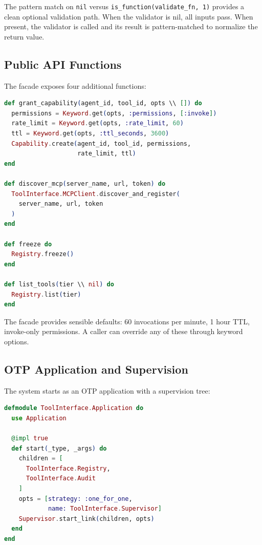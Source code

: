 \documentclass[12pt,a4paper]{article}
\theoremstyle{plain}
\theoremstyle{definition}
\begin{document}
The pattern match on \texttt{nil} versus \texttt{is\_function(validate\_fn, 1)} provides a clean optional validation path. When the validator is nil, all inputs pass. When present, the validator is called and its result is pattern-matched to normalize the return value.

\subsection{Public API Functions}

The facade exposes four additional functions:

\begin{lstlisting}[language=elixir, caption={Facade public API.}, label={lst:facade-api}]
def grant_capability(agent_id, tool_id, opts \\ []) do
  permissions = Keyword.get(opts, :permissions, [:invoke])
  rate_limit = Keyword.get(opts, :rate_limit, 60)
  ttl = Keyword.get(opts, :ttl_seconds, 3600)
  Capability.create(agent_id, tool_id, permissions,
                    rate_limit, ttl)
end

def discover_mcp(server_name, url, token) do
  ToolInterface.MCPClient.discover_and_register(
    server_name, url, token
  )
end

def freeze do
  Registry.freeze()
end

def list_tools(tier \\ nil) do
  Registry.list(tier)
end
\end{lstlisting}

The facade provides sensible defaults: 60 invocations per minute, 1 hour TTL, invoke-only permissions. A caller can override any of these through keyword options.

\subsection{OTP Application and Supervision}

The system starts as an OTP application with a supervision tree:

\begin{lstlisting}[language=elixir, caption={OTP supervision tree.}, label={lst:supervision}]
defmodule ToolInterface.Application do
  use Application

  @impl true
  def start(_type, _args) do
    children = [
      ToolInterface.Registry,
      ToolInterface.Audit
    ]
    opts = [strategy: :one_for_one,
            name: ToolInterface.Supervisor]
    Supervisor.start_link(children, opts)
  end
end
\end{lstlisting}
\end{document}
